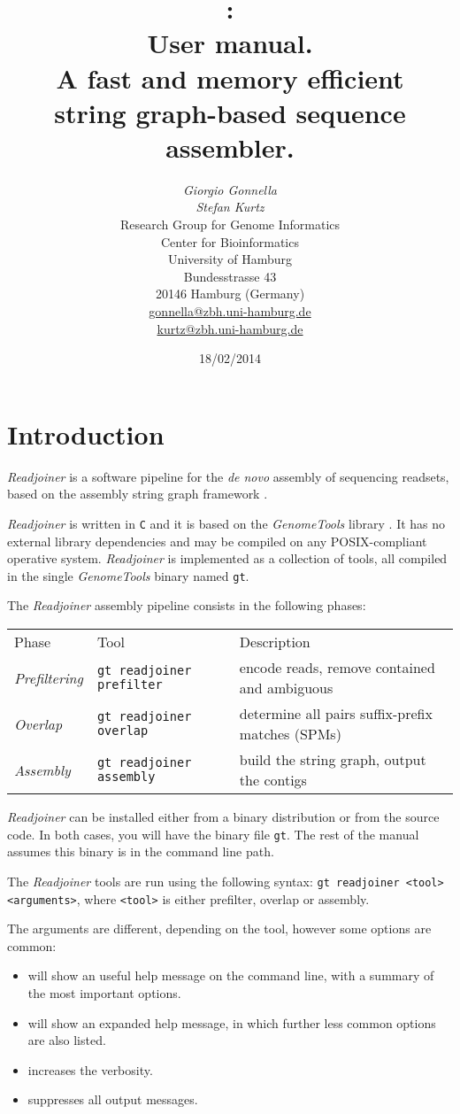\documentclass[12pt,titlepage]{article}
\title{\Huge{\Readjoiner 1.2:\\ User manual.}\\[3mm]
\Large{A fast and memory efficient \\string
 graph-based sequence assembler.}}
\author{\begin{tabular}{c}
         \textit{Giorgio Gonnella}\\
         \textit{Stefan Kurtz}\\[2cm]
         Research Group for Genome Informatics\\
         Center for Bioinformatics\\
         University of Hamburg\\
         Bundesstrasse 43\\
         20146 Hamburg (Germany)\\[1cm]
         \url{gonnella@zbh.uni-hamburg.de}\\
         \url{kurtz@zbh.uni-hamburg.de}\\[1cm]
        \end{tabular}}
\date{18/02/2014}
\newcommand{\GenomeTools}{\textit{GenomeTools}\xspace}
\newcommand{\Readjoiner}{\textit{Readjoiner}\xspace}
\newcommand{\Gtcmd}{\texttt{gt}\xspace}
\newcommand{\Rdjprefiltercmd}{\texttt{gt readjoiner prefilter}\xspace}
\newcommand{\Rdjoverlapcmd}{\texttt{gt readjoiner overlap}\xspace}
\newcommand{\Rdjassemblycmd}{\texttt{gt readjoiner assembly}\xspace}
\begin{document}
\maketitle

\section{Introduction} \label{Introduction}

\Readjoiner is a software pipeline for the \textit{de novo} assembly of
 sequencing readsets, based on the assembly string graph framework
  \cite{MYE:2005}.

\Readjoiner is written in \texttt{C} and it is based on the
\GenomeTools library \cite{genometools}. It has no external library
dependencies and may be compiled on any POSIX-compliant operative system.
 \Readjoiner is implemented as a collection of tools, all compiled in the single
\GenomeTools binary named \Gtcmd.

The \Readjoiner assembly pipeline consists in the following phases:\\[3mm]
\begin{tabular}{lll}
Phase & Tool & Description \\
\textit{Prefiltering} & \Rdjprefiltercmd &
  encode reads, remove contained and ambiguous\\
\textit{Overlap}   & \Rdjoverlapcmd &
  determine all pairs suffix-prefix matches (SPMs) \\
\textit{Assembly}  & \Rdjassemblycmd &
 build the string graph, output the contigs \\
\end{tabular}

\Readjoiner can be installed either from a binary distribution or from the
source code. In both cases, you will have the binary file \texttt{gt}.
The rest of the manual assumes this binary is in the command line path.

The \Readjoiner tools are run using the following syntax:
\texttt{gt readjoiner <tool> <arguments>}, where \texttt{<tool>}
is either prefilter, overlap or assembly.

The arguments are different,
depending on the tool, however some options are common:
\begin{itemize}
\item {} will show an useful help message on the command
line, with a summary of the most important options.
\item {} will show an expanded help message, in which
further less common options are also listed.
\item {} increases the verbosity.
\item {} suppresses all output messages.
\end{itemize}
\end{document}
